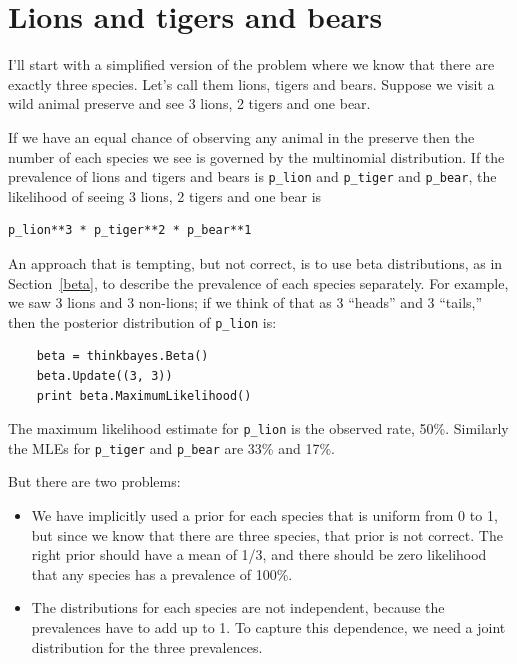 \documentclass[12pt]{book}
\begin{document}
\section{Lions and tigers and bears}

I'll start with a simplified version of the problem where we know that
there are exactly three species.  Let's call them lions, tigers and
bears.  Suppose we visit a wild animal preserve and see 3 lions, 2
tigers and one bear.

If we have an equal chance of observing any animal in the preserve
then the number of each species we see is governed by the multinomial
distribution.  If the prevalence of lions and tigers and bears is
\verb"p_lion" and \verb"p_tiger" and \verb"p_bear", the likelihood of
seeing 3 lions, 2 tigers and one bear is

\begin{verbatim}
p_lion**3 * p_tiger**2 * p_bear**1
\end{verbatim}

An approach that is tempting, but not correct, is to use beta
distributions, as in Section~\ref{beta}, to describe the prevalence of
each species separately.  For example, we saw 3 lions and 3 non-lions;
if we think of that as 3 ``heads'' and 3 ``tails,'' then the posterior
distribution of \verb"p_lion" is:

\begin{verbatim}
    beta = thinkbayes.Beta()
    beta.Update((3, 3))
    print beta.MaximumLikelihood()
\end{verbatim}

The maximum likelihood estimate for \verb"p_lion" is the observed
rate, 50\%.  Similarly the MLEs for \verb"p_tiger" and \verb"p_bear"
are 33\% and 17\%.

But there are two problems:

\begin{itemize}

\item We have implicitly used a prior for each species that is uniform
  from 0 to 1, but since we know that there are three species, that
  prior is not correct.  The right prior should have a mean of 1/3,
  and there should be zero likelihood that any species has a
  prevalence of 100\%.

\item The distributions for each species are not independent, because
  the prevalences have to add up to 1.  To capture this dependence, we
  need a joint distribution for the three prevalences.

\end{itemize}
\end{document}
